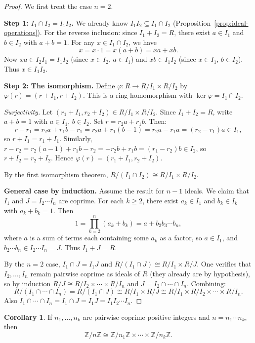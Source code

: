 \documentclass[12pt,a4paper,openany]{book}
\theoremstyle{definition}
\newtheorem{corollary}{Corollary}[chapter]
\theoremstyle{remark}
\begin{document}
\begin{proof}
We first treat the case $n=2$.

\textbf{Step 1: $I_1\cap I_2=I_1I_2$.} We already know $I_1I_2\subseteq I_1\cap I_2$ (Proposition~\ref{prop:ideal-operations}). For the reverse inclusion: since $I_1+I_2=R$, there exist $a\in I_1$ and $b\in I_2$ with $a+b=1$. For any $x\in I_1\cap I_2$, we have
\[
    x = x\cdot 1 = x(a+b) = xa+xb.
\]
Now $xa\in I_2I_1=I_1I_2$ (since $x\in I_2$, $a\in I_1$) and $xb\in I_1I_2$ (since $x\in I_1$, $b\in I_2$). Thus $x\in I_1I_2$.

\textbf{Step 2: The isomorphism.} Define $\varphi\colon R\to R/I_1\times R/I_2$ by $\varphi(r)=(r+I_1,r+I_2)$. This is a ring homomorphism with $\ker\varphi=I_1\cap I_2$.

\emph{Surjectivity.} Let $(r_1+I_1,r_2+I_2)\in R/I_1\times R/I_2$. Since $I_1+I_2=R$, write $a+b=1$ with $a\in I_1$, $b\in I_2$. Set $r=r_2a+r_1b$. Then:
\[
    r - r_1 = r_2a + r_1b - r_1 = r_2a + r_1(b-1) = r_2a - r_1a = (r_2-r_1)a \in I_1,
\]
so $r+I_1=r_1+I_1$. Similarly, $r-r_2=r_2(a-1)+r_1b-r_2=-r_2b+r_1b=(r_1-r_2)b\in I_2$, so $r+I_2=r_2+I_2$. Hence $\varphi(r)=(r_1+I_1,r_2+I_2)$.

By the first isomorphism theorem, $R/(I_1\cap I_2)\cong R/I_1\times R/I_2$.

\textbf{General case by induction.} Assume the result for $n-1$ ideals. We claim that $I_1$ and $J=I_2\cdots I_n$ are coprime. For each $k\geq 2$, there exist $a_k\in I_1$ and $b_k\in I_k$ with $a_k+b_k=1$. Then
\[
    1 = \prod_{k=2}^{n}(a_k+b_k) = a + b_2b_3\cdots b_n,
\]
where $a$ is a sum of terms each containing some $a_k$ as a factor, so $a\in I_1$, and $b_2\cdots b_n\in I_2\cdots I_n=J$. Thus $I_1+J=R$.

By the $n=2$ case, $I_1\cap J=I_1J$ and $R/(I_1\cap J)\cong R/I_1\times R/J$. One verifies that $I_2,\ldots,I_n$ remain pairwise coprime as ideals of $R$ (they already are by hypothesis), so by induction $R/J\cong R/I_2\times\cdots\times R/I_n$ and $J=I_2\cap\cdots\cap I_n$. Combining:
\[
    R/(I_1\cap\cdots\cap I_n) = R/(I_1\cap J)\cong R/I_1\times R/J\cong R/I_1\times R/I_2\times\cdots\times R/I_n.
\]
Also $I_1\cap\cdots\cap I_n=I_1\cap J=I_1J=I_1I_2\cdots I_n$.
\end{proof}

\begin{corollary}\label{cor:CRT-Z}
If $n_1,\ldots,n_k$ are pairwise coprime positive integers and $n=n_1\cdots n_k$, then
\[
    \mathbb{Z}/n\mathbb{Z}\cong\mathbb{Z}/n_1\mathbb{Z}\times\cdots\times\mathbb{Z}/n_k\mathbb{Z}.
\]
\end{corollary}
\end{document}
